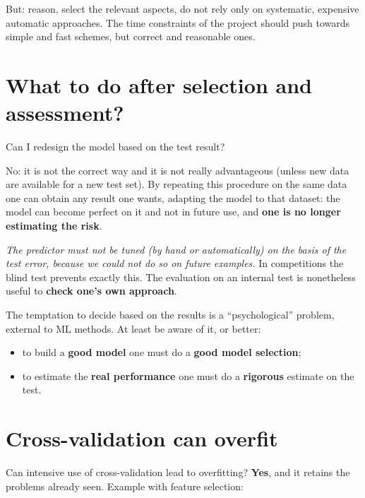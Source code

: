 But: reason, select the relevant aspects, do not rely only on
systematic, expensive automatic approaches. The time constraints of the
project should push towards simple and fast schemes, but correct and
reasonable ones.

\section{What to do after selection and
assessment?}\label{cosa-fare-dopo-selezione-e-valutazione}

\begin{boxquestion}{Can I redesign the model based on the test result?}

No: it is not the correct way and it is not really advantageous (unless
new data are available for a new test set). By repeating this procedure
on the same data one can obtain any result one wants, adapting the
model to that dataset: the model can become perfect on it and not in
future use, and \textbf{one is no longer estimating the risk}.

\emph{The predictor must not be tuned (by hand or automatically) on
the basis of the test error, because we could not do so on future
examples.} In competitions the blind test prevents exactly this. The
evaluation on an internal test is nonetheless useful to \textbf{check
one's own approach}.

\end{boxquestion}

The temptation to decide based on the results is a ``psychological''
problem, external to ML methods. At least be aware of it, or better:

\begin{itemize}
\tightlist
\item
  to build a \textbf{good model} one must do a \textbf{good model
  selection};
\item
  to estimate the \textbf{real performance} one must do a
  \textbf{rigorous} estimate on the test.
\end{itemize}

\section{Cross-validation can
overfit}\label{la-cross-validation-puuxf2-andare-in-overfitting}

Can intensive use of cross-validation lead to overfitting?
\textbf{Yes}, and it retains the problems already seen. Example with
feature selection:

